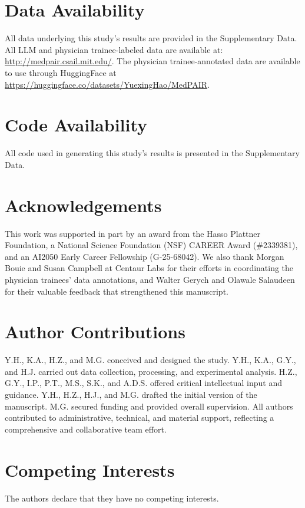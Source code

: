 \documentclass[fleqn,10pt]{wlscirep}
\begin{document}
\section{Data Availability}
All data underlying this study’s results are provided in the Supplementary Data. All LLM and physician trainee-labeled data are available at: \url{http://medpair.csail.mit.edu/}. The physician trainee-annotated data are available to use through HuggingFace at \url{https://huggingface.co/datasets/YuexingHao/MedPAIR}.

\section{Code Availability}
All code used in generating this study's results is presented in the Supplementary Data.

\section{Acknowledgements}
This work was supported in part by an award from the Hasso Plattner Foundation, a National Science Foundation (NSF) CAREER Award (\#2339381), and an AI2050 Early Career Fellowship (G-25-68042). We also thank Morgan Bouie and Susan Campbell at Centaur Labs for their efforts in coordinating the physician trainees’ data annotations, and Walter Gerych and Olawale Salaudeen for their valuable feedback that strengthened this manuscript.

\section{Author Contributions}

Y.H., K.A., H.Z., and M.G. conceived and designed the study. Y.H., K.A., G.Y., and H.J. carried out data collection, processing, and experimental analysis. H.Z., G.Y., I.P., P.T., M.S., S.K., and A.D.S. offered critical intellectual input and guidance. Y.H., H.Z., H.J., and M.G. drafted the initial version of the manuscript. M.G. secured funding and provided overall supervision. All authors contributed to administrative, technical, and material support, reflecting a comprehensive and collaborative team effort.

\section{Competing Interests}
The authors declare that they have no competing interests.



\end{document}
